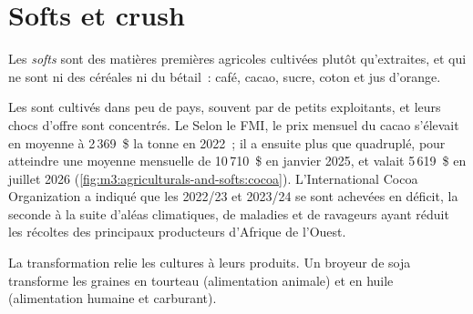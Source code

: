 \section{Softs et crush}

\begin{definition}[Softs]\label{def:m3:agriculturals-and-softs:softs}
Les \emph{softs} sont des matières premières agricoles cultivées plutôt qu'extraites, et qui ne sont
ni des céréales ni du bétail~: café, cacao, sucre, coton et jus d'orange.
\end{definition}

Les  sont cultivés dans peu de pays, souvent par de petits exploitants, et leurs chocs d'offre sont concentrés. Le
Selon le FMI, le prix mensuel du cacao s'élevait en moyenne à 2\,369~\$ la tonne en 2022~; il a ensuite plus que quadruplé, pour atteindre une moyenne mensuelle de
10\,710~\$ en janvier 2025, et valait 5\,619~\$ en juillet 2026
(\cref{fig:m3:agriculturals-and-softs:cocoa}). L'International Cocoa Organization a indiqué que les  2022/23 et 2023/24
se sont achevées en déficit, la seconde à la suite d'aléas climatiques, de maladies et de ravageurs ayant réduit les récoltes des principaux producteurs d'Afrique de l'Ouest.

\begin{omfigure}

\label{fig:m3:agriculturals-and-softs:cocoa}
\end{omfigure}

La transformation relie les cultures à leurs produits. Un broyeur de soja transforme les graines en tourteau (alimentation animale) et en huile
(alimentation humaine et carburant).

